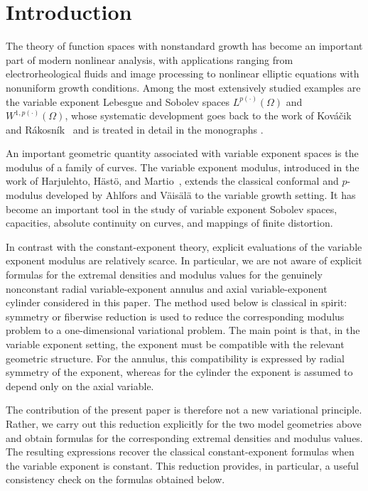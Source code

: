 \documentclass[12pt]{amsart}
\numberwithin{equation}{section}
\theoremstyle{plain}
\theoremstyle{definition}
\begin{document}
\section{Introduction}\label{sec:intro}

The theory of function spaces with nonstandard growth has become an
important part of modern nonlinear analysis, with applications ranging
from electrorheological fluids and image processing to nonlinear
elliptic equations with nonuniform growth conditions. Among the most
extensively studied examples are the variable exponent Lebesgue and
Sobolev spaces
$L^{p(\cdot)}(\Omega)$ and $W^{1,p(\cdot)}(\Omega)$,
whose systematic development goes back to the work of
Kov\'a\v{cik and R\'akosn\'ik}~\cite{KR} and is treated in detail in
the monographs \cite{Cruz2013,Diening2011}.

An important geometric quantity associated with variable exponent
spaces is the modulus of a family of curves. The variable exponent
modulus, introduced in the work of Harjulehto, H\"ast\"o, and
Martio~\cite{HHM}, extends the classical conformal and $p$-modulus
developed by Ahlfors and V\"ais\"al\"a
\cite{Ahlfors,Vaisala} to the variable growth setting. It has become
an important tool in the study of variable exponent Sobolev spaces,
capacities, absolute continuity on curves, and mappings of finite
distortion.

In contrast with the constant-exponent theory, explicit evaluations
of the variable exponent modulus are relatively scarce. In particular,
we are not aware of explicit formulas for the extremal densities and
modulus values for the genuinely nonconstant radial variable-exponent annulus and axial variable-exponent cylinder considered in this paper.
The method used below is classical in spirit: symmetry or fiberwise
reduction is used to reduce the corresponding modulus problem to a
one-dimensional variational problem. The main point is that, in the
variable exponent setting, the exponent must be compatible with the
relevant geometric structure. For the annulus, this compatibility is
expressed by radial symmetry of the exponent, whereas for the cylinder
the exponent is assumed to depend only on the axial variable.

The contribution of the present paper is therefore not a new
variational principle. Rather, we carry out this reduction explicitly
for the two model geometries above and obtain formulas for the
corresponding extremal densities and modulus values. The resulting
expressions recover the classical constant-exponent formulas when the
variable exponent is constant. This reduction provides, in particular,
a useful consistency check on the formulas obtained below.
\end{document}
